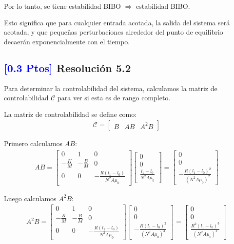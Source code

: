 \documentclass[
  11pt,
  letterpaper,
   addpoints,
   answers
  ]{exam}
\begin{document}
\begin{solution}
Por lo tanto, se tiene estabilidad BIBO $\Rightarrow$ estabilidad BIBO.

Esto significa que para cualquier entrada acotada, la salida del sistema será acotada, y que pequeñas perturbaciones alrededor del punto de equilibrio decaerán exponencialmente con el tiempo.

\subsection*{\textcolor{blue}{[0.3 Ptos]} Resolución 5.2}

Para determinar la controlabilidad del sistema, calculamos la matriz de controlabilidad $\mathcal{C}$ para ver si esta es de rango completo.

La matriz de controlabilidad se define como:
\begin{align}
\mathcal{C} = \begin{bmatrix} B & AB & A^2B \end{bmatrix}
\end{align}

Primero calculamos $AB$:
\begin{align}
AB = \begin{bmatrix}
0 & 1 & 0 \\
-\frac{K}{M} & -\frac{B}{M} & 0 \\
0 & 0 & -\frac{R(l_1-l_0)}{N^2A\mu_0}
\end{bmatrix} \begin{bmatrix}
0 \\
0 \\
\frac{l_1-l_0}{N^2A\mu_0}
\end{bmatrix} = \begin{bmatrix}
0 \\
0 \\
-\frac{R(l_1-l_0)^2}{(N^2A\mu_0)^2}
\end{bmatrix}
\end{align}

Luego calculamos $A^2B$:
\begin{align}
A^2B = \begin{bmatrix}
0 & 1 & 0 \\
-\frac{K}{M} & -\frac{B}{M} & 0 \\
0 & 0 & -\frac{R(l_1-l_0)}{N^2A\mu_0}
\end{bmatrix} \begin{bmatrix}
0 \\
0 \\
-\frac{R(l_1-l_0)^2}{(N^2A\mu_0)^2}
\end{bmatrix} = \begin{bmatrix}
0 \\
0 \\
\frac{R^2(l_1-l_0)^3}{(N^2A\mu_0)^3}
\end{bmatrix}
\end{align}


\end{solution}
\end{document}
